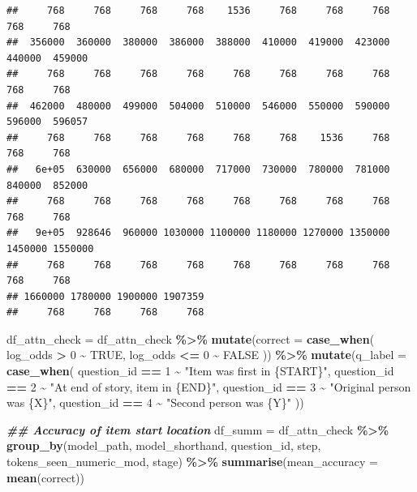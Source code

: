 \documentclass[
]{article}
\newenvironment{Shaded}{\begin{snugshade}}{\end{snugshade}}
\newcommand{\AttributeTok}[1]{\textcolor[rgb]{0.13,0.29,0.53}{#1}}
\newcommand{\ConstantTok}[1]{\textcolor[rgb]{0.56,0.35,0.01}{#1}}
\newcommand{\DecValTok}[1]{\textcolor[rgb]{0.00,0.00,0.81}{#1}}
\newcommand{\DocumentationTok}[1]{\textcolor[rgb]{0.56,0.35,0.01}{\textbf{\textit{#1}}}}
\newcommand{\FunctionTok}[1]{\textcolor[rgb]{0.13,0.29,0.53}{\textbf{#1}}}
\newcommand{\NormalTok}[1]{#1}
\newcommand{\OtherTok}[1]{\textcolor[rgb]{0.56,0.35,0.01}{#1}}
\newcommand{\SpecialCharTok}[1]{\textcolor[rgb]{0.81,0.36,0.00}{\textbf{#1}}}
\newcommand{\StringTok}[1]{\textcolor[rgb]{0.31,0.60,0.02}{#1}}
\begin{document}
\begin{verbatim}
##     768     768     768     768    1536     768     768     768     768     768 
##  356000  360000  380000  386000  388000  410000  419000  423000  440000  459000 
##     768     768     768     768     768     768     768     768     768     768 
##  462000  480000  499000  504000  510000  546000  550000  590000  596000  596057 
##     768     768     768     768     768     768    1536     768     768     768 
##   6e+05  630000  656000  680000  717000  730000  780000  781000  840000  852000 
##     768     768     768     768     768     768     768     768     768     768 
##   9e+05  928646  960000 1030000 1100000 1180000 1270000 1350000 1450000 1550000 
##     768     768     768     768     768     768     768     768     768     768 
## 1660000 1780000 1900000 1907359 
##     768     768     768     768
\end{verbatim}

\begin{Shaded}
\begin{Highlighting}[]
\NormalTok{df\_attn\_check }\OtherTok{=}\NormalTok{ df\_attn\_check }\SpecialCharTok{\%\textgreater{}\%}
  \FunctionTok{mutate}\NormalTok{(}\AttributeTok{correct =} \FunctionTok{case\_when}\NormalTok{(}
\NormalTok{    log\_odds }\SpecialCharTok{\textgreater{}} \DecValTok{0} \SpecialCharTok{\textasciitilde{}} \ConstantTok{TRUE}\NormalTok{,}
\NormalTok{    log\_odds }\SpecialCharTok{\textless{}=} \DecValTok{0} \SpecialCharTok{\textasciitilde{}} \ConstantTok{FALSE}
\NormalTok{  )) }\SpecialCharTok{\%\textgreater{}\%}
  \FunctionTok{mutate}\NormalTok{(}\AttributeTok{q\_label =} \FunctionTok{case\_when}\NormalTok{(}
\NormalTok{    question\_id }\SpecialCharTok{==} \DecValTok{1} \SpecialCharTok{\textasciitilde{}} \StringTok{"Item was first in \{START\}"}\NormalTok{,}
\NormalTok{    question\_id }\SpecialCharTok{==} \DecValTok{2} \SpecialCharTok{\textasciitilde{}} \StringTok{"At end of story, item in \{END\}"}\NormalTok{,}
\NormalTok{    question\_id }\SpecialCharTok{==} \DecValTok{3} \SpecialCharTok{\textasciitilde{}} \StringTok{"Original person was \{X\}"}\NormalTok{,}
\NormalTok{    question\_id }\SpecialCharTok{==} \DecValTok{4} \SpecialCharTok{\textasciitilde{}} \StringTok{"Second person was \{Y\}"}
\NormalTok{  ))}

\DocumentationTok{\#\# Accuracy of item start location}
\NormalTok{df\_summ }\OtherTok{=}\NormalTok{ df\_attn\_check }\SpecialCharTok{\%\textgreater{}\%}
  \FunctionTok{group\_by}\NormalTok{(model\_path, model\_shorthand, question\_id,}
\NormalTok{           step, tokens\_seen\_numeric\_mod, stage) }\SpecialCharTok{\%\textgreater{}\%}
  \FunctionTok{summarise}\NormalTok{(}\AttributeTok{mean\_accuracy =} \FunctionTok{mean}\NormalTok{(correct)) }
\end{Highlighting}
\end{Shaded}
\end{document}
